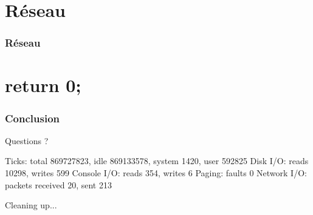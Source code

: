 \documentclass{beamer}
\begin{document}
\section{Réseau}
\begin{frame}
  \frametitle{Réseau}
\end{frame}


\section*{return 0;}

\begin{frame}[fragile]
  \frametitle{Conclusion}
\begin{verbaterm}[fontsize=\scriptsize]
Questions ?

Ticks: total 869727823, idle 869133578, system 1420, user 592825
Disk I/O: reads 10298, writes 599
Console I/O: reads 354, writes 6
Paging: faults 0
Network I/O: packets received 20, sent 213

Cleaning up...
\end{verbaterm}

\end{frame}
\end{document}
